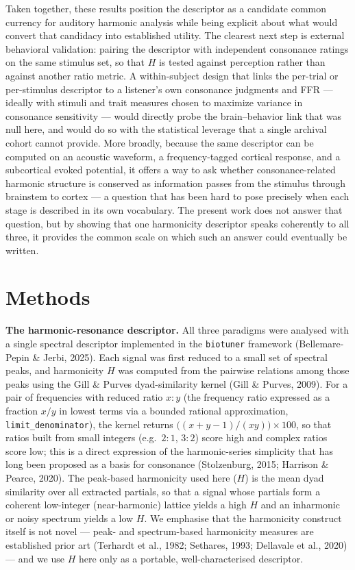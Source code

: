 \documentclass[11pt]{article}
\begin{document}
Taken together, these results position the descriptor as a candidate common currency for auditory harmonic analysis while being explicit about what would convert that candidacy into established utility. The clearest next step is external behavioral validation: pairing the descriptor with independent consonance ratings on the same stimulus set, so that $H$ is tested against perception rather than against another ratio metric. A within-subject design that links the per-trial or per-stimulus descriptor to a listener's own consonance judgments and FFR --- ideally with stimuli and trait measures chosen to maximize variance in consonance sensitivity --- would directly probe the brain--behavior link that was null here, and would do so with the statistical leverage that a single archival cohort cannot provide. More broadly, because the same descriptor can be computed on an acoustic waveform, a frequency-tagged cortical response, and a subcortical evoked potential, it offers a way to ask whether consonance-related harmonic structure is conserved as information passes from the stimulus through brainstem to cortex --- a question that has been hard to pose precisely when each stage is described in its own vocabulary. The present work does not answer that question, but by showing that one harmonicity descriptor speaks coherently to all three, it provides the common scale on which such an answer could eventually be written.

\section{Methods}
\textbf{The harmonic-resonance descriptor.} All three paradigms were analysed with a single spectral descriptor implemented in the \texttt{biotuner} framework (Bellemare-Pepin \& Jerbi, 2025). Each signal was first reduced to a small set of spectral peaks, and harmonicity $H$ was computed from the pairwise relations among those peaks using the Gill \& Purves dyad-similarity kernel (Gill \& Purves, 2009). For a pair of frequencies with reduced ratio $x{:}y$ (the frequency ratio expressed as a fraction $x/y$ in lowest terms via a bounded rational approximation, \texttt{limit\_denominator}), the kernel returns $\big((x+y-1)/(xy)\big)\times100$, so that ratios built from small integers (e.g.\ $2{:}1$, $3{:}2$) score high and complex ratios score low; this is a direct expression of the harmonic-series simplicity that has long been proposed as a basis for consonance (Stolzenburg, 2015; Harrison \& Pearce, 2020). The peak-based harmonicity used here ($H$) is the mean dyad similarity over all extracted partials, so that a signal whose partials form a coherent low-integer (near-harmonic) lattice yields a high $H$ and an inharmonic or noisy spectrum yields a low $H$. We emphasise that the harmonicity construct itself is not novel — peak- and spectrum-based harmonicity measures are established prior art (Terhardt et al., 1982; Sethares, 1993; Dellavale et al., 2020) — and we use $H$ here only as a portable, well-characterised descriptor.
\end{document}
